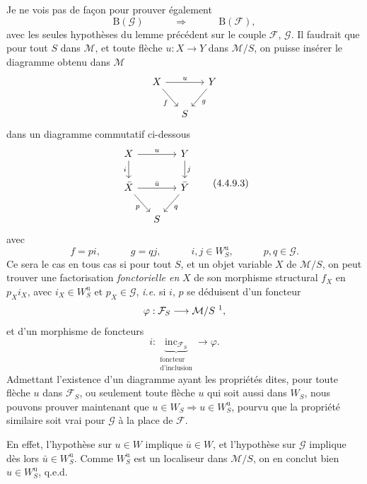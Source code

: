 \documentclass[11pt]{article}
\newcommand{\printedpage}[1]{\marginpar{\footnotesize p.~#1}}
\newcommand{\msp}[1]{\marginpar{\footnotesize [#1]}}
\newcommand{\inc}{\mathrm{inc}}
\begin{document}
Je ne vois pas de façon pour prouver également
\[
\mathrm{B}(\mathcal{G}) \qquad\quad \Longrightarrow \qquad\quad \mathrm{B}(\mathcal{F}),
\]
avec les seules hypothèses du lemme précédent sur le couple $\mathcal{F}$, $\mathcal{G}$. Il faudrait que pour tout $S$ dans $\mathcal{M}$, et toute flèche
\msp{page 53}
$u : X \longrightarrow Y$ dans $\mathcal{M}/S$, on puisse insérer le diagramme obtenu dans $\mathcal{M}$
\[
\begin{tikzcd}[column sep=small]
X \arrow[rr, "u"] \arrow[dr, "f"'] & & Y \arrow[dl, "g"] \\
& S &
\end{tikzcd}
\]
\printedpage{31}
dans un diagramme commutatif ci-dessous
\[
\begin{tikzcd}[column sep=small]
X \arrow[rr, "u"] \arrow[d, "i"'] & & Y \arrow[d, "j"] \\
\bar{X} \arrow[rr, "\bar{u}"] \arrow[dr, "p"'] & & \bar{Y} \arrow[dl, "q"] \\
& S &
\end{tikzcd}
\tag*{(4.4.9.3)}
\]
avec
\[
f = pi, \qquad\quad g = qj, \qquad\quad i, j \in W^{\mathrm{u}}_S, \qquad\quad p, q \in \mathcal{G}.
\]
Ce sera le cas en tous cas si pour tout $S$, et un objet variable $X$ de $\mathcal{M}/S$, on peut trouver une factorisation \textit{fonctorielle en} $X$ de son morphisme structural $f_X$ en $p_X i_X$, avec $i_X \in W^{\mathrm{u}}_S$ et $p_X \in \mathcal{G}$, \textit{i.e.} si $i$, $p$ se déduisent d'un foncteur
\[
\varphi : \mathcal{F}_S \longrightarrow \mathcal{M}/S \ \text{\footnotemark},
\]
et d'un morphisme de foncteurs
\[
i : \underbrace{\inc_{\mathcal{F}_S}}_{\substack{\text{foncteur}\\ \text{d'inclusion}}} \longrightarrow \varphi.
\]
Admettant l'existence d'un diagramme ayant les propriétés dites, pour toute flèche $u$ dans $\mathcal{F}_S$, ou seulement toute flèche $u$ qui soit aussi dans $W_S$, nous pouvons prouver maintenant que $u \in W_S \Longrightarrow u \in W^{\mathrm{u}}_S$, pourvu que la propriété similaire soit vrai pour $\mathcal{G}$ à la place de $\mathcal{F}$.

\msp{page 54}
En effet, l'hypothèse sur $u \in W$ implique $\bar{u} \in W$, et l'hypothèse sur $\mathcal{G}$ implique dès lors $\bar{u} \in W^{\mathrm{u}}_S$. Comme $W^{\mathrm{u}}_S$ est un localiseur dans $\mathcal{M}/S$, on en conclut bien $u \in W^{\mathrm{u}}_S$, q.e.d.
\end{document}
